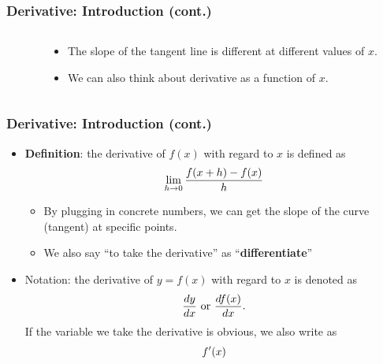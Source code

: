 \documentclass[pdflatex, 12pt]{beamer}
\begin{document}
\begin{frame}
\frametitle{Derivative: Introduction (cont.)}
\begin{columns}
\begin{column}{0.5\textwidth}
\centering
{}
\end{column}
\begin{column}{0.5\textwidth}
\begin{itemize}
\item The slope of the tangent line is different at different values of $x$.
\vspace{0.4cm}
\item We can also think about derivative as a function of $x$. 
\end{itemize}
\end{column}
\end{columns}
\end{frame}

\begin{frame}
\frametitle{Derivative: Introduction (cont.)}
\begin{itemize}
\item \textbf{Definition}: the derivative of $f(x)$ with regard to $x$ is defined as
 \begin{equation} 
 \lim_{h \to 0} \frac{f(x + h) - f(x)}{h} \notag
 \end{equation}
 \begin{itemize}
 \item By plugging in concrete numbers, we can get the slope of the curve (tangent) at specific points.
 \item We also say ``to take the derivative'' as ``\textbf{differentiate}'' 
 \end{itemize}
\vspace{0.4cm}
\item Notation: the derivative of $y = f(x)$ with regard to $x$ is denoted as
 \begin{equation}
 \frac{dy}{dx}\ \mathrm{or} \ \frac{df(x)}{dx}. \notag
 \end{equation}
If the variable we take the derivative is obvious, we also write as
 \begin{equation}
 f'(x) \notag
 \end{equation}  
\end{itemize}
\end{frame}
\end{document}
